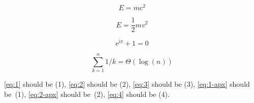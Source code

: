 \documentclass[12pt]{article}
\begin{document}
\begin{thmrep}
  \begin{equation}
    \label{eq:1}
    E=m\mathrm{c}^2
  \end{equation}
\end{thmrep}

\begin{thmrep}
  \begin{equation}
    \label{eq:2}
    E=\frac 1 2 mv^2
  \end{equation}
\end{thmrep}

\begin{equation}
  \mathrm{e}^{\mathrm{i}\pi}+1=0 \label{eq:3}
\end{equation}
  
\begin{toappendix}
  \begin{equation}
    \sum_{k=1}^{n} 1/k=\Theta(\log(n))\label{eq:4}
  \end{equation}

  \eqref{eq:1} should be (1), \eqref{eq:2} should be (2), \eqref{eq:3}
  should be (3), \eqref{eq:1-apx} should be~(1), \eqref{eq:2-apx} should
  be~(2), \eqref{eq:4} should be (4).
\end{toappendix}                  
\end{document}
